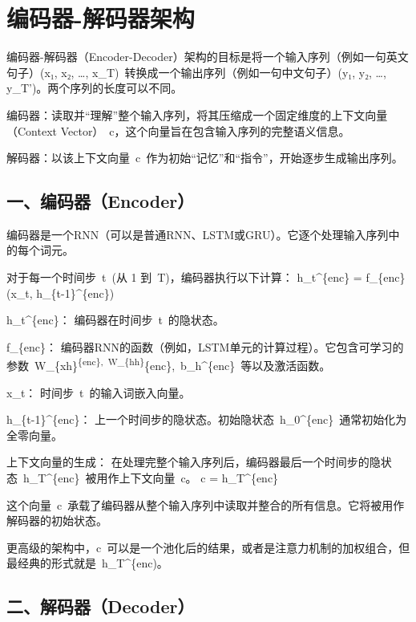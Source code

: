 \setcounter{section}{2}

\hypertarget{ux7f16ux7801ux5668-ux89e3ux7801ux5668ux67b6ux6784}{%
\section{编码器-解码器架构}\label{ux7f16ux7801ux5668-ux89e3ux7801ux5668ux67b6ux6784}}

编码器-解码器（Encoder-Decoder）架构的目标是将一个输入序列（例如一句英文句子）(x₁, x₂, \ldots, x\_T)~转换成一个输出序列（例如一句中文句子）(y₁, y₂, \ldots, y\_T')。两个序列的长度可以不同。

编码器：读取并``理解''整个输入序列，将其压缩成一个固定维度的上下文向量（Context Vector）~c，这个向量旨在包含输入序列的完整语义信息。

解码器：以该上下文向量~c~作为初始``记忆''和``指令''，开始逐步生成输出序列。

\hypertarget{ux4e00ux7f16ux7801ux5668encoder}{%
\subsection{一、编码器（Encoder）}\label{ux4e00ux7f16ux7801ux5668encoder}}

编码器是一个RNN（可以是普通RNN、LSTM或GRU）。它逐个处理输入序列中的每个词元。

对于每一个时间步~t~(从 1 到~T)，编码器执行以下计算：
h\_t\^{}\{enc\} = f\_\{enc\}(x\_t, h\_\{t-1\}\^{}\{enc\})

h\_t\^{}\{enc\}： 编码器在时间步~t~的隐状态。

f\_\{enc\}： 编码器RNN的函数（例如，LSTM单元的计算过程）。它包含可学习的参数~W\_\{xh\}\textsuperscript{\{enc\},~W\_\{hh\}}\{enc\},~b\_h\^{}\{enc\}~等以及激活函数。

x\_t： 时间步~t~的输入词嵌入向量。

h\_\{t-1\}\^{}\{enc\}： 上一个时间步的隐状态。初始隐状态~h\_0\^{}\{enc\}~通常初始化为全零向量。

上下文向量的生成：
在处理完整个输入序列后，编码器最后一个时间步的隐状态~h\_T\^{}\{enc\}~被用作上下文向量~c。
c = h\_T\^{}\{enc\}

这个向量~c~承载了编码器从整个输入序列中读取并整合的所有信息。它将被用作解码器的初始状态。

更高级的架构中，c~可以是一个池化后的结果，或者是注意力机制的加权组合，但最经典的形式就是~h\_T\^{}\{enc)。

\hypertarget{ux4e8cux89e3ux7801ux5668decoder}{%
\subsection{二、解码器（Decoder）}\label{ux4e8cux89e3ux7801ux5668decoder}}


